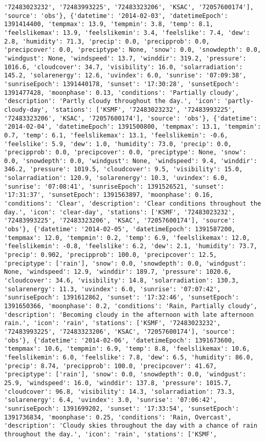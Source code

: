 \documentclass[
  letterpaper,
  DIV=11,
  numbers=noendperiod]{scrartcl}
\begin{document}
\begin{verbatim}
'72483023232', '72483993225', '72483323206', 'KSAC', '72057600174'], 'source': 'obs'}, {'datetime': '2014-02-03', 'datetimeEpoch': 1391414400, 'tempmax': 13.9, 'tempmin': 3.8, 'temp': 8.1, 'feelslikemax': 13.9, 'feelslikemin': 3.4, 'feelslike': 7.4, 'dew': 2.8, 'humidity': 71.3, 'precip': 0.0, 'precipprob': 0.0, 'precipcover': 0.0, 'preciptype': None, 'snow': 0.0, 'snowdepth': 0.0, 'windgust': None, 'windspeed': 13.7, 'winddir': 319.2, 'pressure': 1016.6, 'cloudcover': 34.7, 'visibility': 16.0, 'solarradiation': 145.2, 'solarenergy': 12.6, 'uvindex': 6.0, 'sunrise': '07:09:38', 'sunriseEpoch': 1391440178, 'sunset': '17:30:28', 'sunsetEpoch': 1391477428, 'moonphase': 0.13, 'conditions': 'Partially cloudy', 'description': 'Partly cloudy throughout the day.', 'icon': 'partly-cloudy-day', 'stations': ['KSMF', '72483023232', '72483993225', '72483323206', 'KSAC', '72057600174'], 'source': 'obs'}, {'datetime': '2014-02-04', 'datetimeEpoch': 1391500800, 'tempmax': 13.1, 'tempmin': 0.7, 'temp': 6.1, 'feelslikemax': 13.1, 'feelslikemin': -0.6, 'feelslike': 5.9, 'dew': 1.0, 'humidity': 73.0, 'precip': 0.0, 'precipprob': 0.0, 'precipcover': 0.0, 'preciptype': None, 'snow': 0.0, 'snowdepth': 0.0, 'windgust': None, 'windspeed': 9.4, 'winddir': 346.2, 'pressure': 1019.5, 'cloudcover': 9.5, 'visibility': 15.0, 'solarradiation': 120.9, 'solarenergy': 10.3, 'uvindex': 6.0, 'sunrise': '07:08:41', 'sunriseEpoch': 1391526521, 'sunset': '17:31:37', 'sunsetEpoch': 1391563897, 'moonphase': 0.16, 'conditions': 'Clear', 'description': 'Clear conditions throughout the day.', 'icon': 'clear-day', 'stations': ['KSMF', '72483023232', '72483993225', '72483323206', 'KSAC', '72057600174'], 'source': 'obs'}, {'datetime': '2014-02-05', 'datetimeEpoch': 1391587200, 'tempmax': 12.0, 'tempmin': 0.2, 'temp': 6.9, 'feelslikemax': 12.0, 'feelslikemin': -0.8, 'feelslike': 6.2, 'dew': 2.1, 'humidity': 73.7, 'precip': 0.902, 'precipprob': 100.0, 'precipcover': 12.5, 'preciptype': ['rain'], 'snow': 0.0, 'snowdepth': 0.0, 'windgust': None, 'windspeed': 12.9, 'winddir': 189.7, 'pressure': 1020.6, 'cloudcover': 34.6, 'visibility': 14.8, 'solarradiation': 130.3, 'solarenergy': 11.3, 'uvindex': 6.0, 'sunrise': '07:07:42', 'sunriseEpoch': 1391612862, 'sunset': '17:32:46', 'sunsetEpoch': 1391650366, 'moonphase': 0.2, 'conditions': 'Rain, Partially cloudy', 'description': 'Becoming cloudy in the afternoon with late afternoon rain.', 'icon': 'rain', 'stations': ['KSMF', '72483023232', '72483993225', '72483323206', 'KSAC', '72057600174'], 'source': 'obs'}, {'datetime': '2014-02-06', 'datetimeEpoch': 1391673600, 'tempmax': 10.6, 'tempmin': 6.9, 'temp': 8.8, 'feelslikemax': 10.6, 'feelslikemin': 6.0, 'feelslike': 7.8, 'dew': 6.5, 'humidity': 86.0, 'precip': 8.74, 'precipprob': 100.0, 'precipcover': 41.67, 'preciptype': ['rain'], 'snow': 0.0, 'snowdepth': 0.0, 'windgust': 25.9, 'windspeed': 16.0, 'winddir': 137.8, 'pressure': 1015.7, 'cloudcover': 96.8, 'visibility': 14.3, 'solarradiation': 73.3, 'solarenergy': 6.4, 'uvindex': 3.0, 'sunrise': '07:06:42', 'sunriseEpoch': 1391699202, 'sunset': '17:33:54', 'sunsetEpoch': 1391736834, 'moonphase': 0.25, 'conditions': 'Rain, Overcast', 'description': 'Cloudy skies throughout the day with a chance of rain throughout the day.', 'icon': 'rain', 'stations': ['KSMF', 
\end{verbatim}
\end{document}
